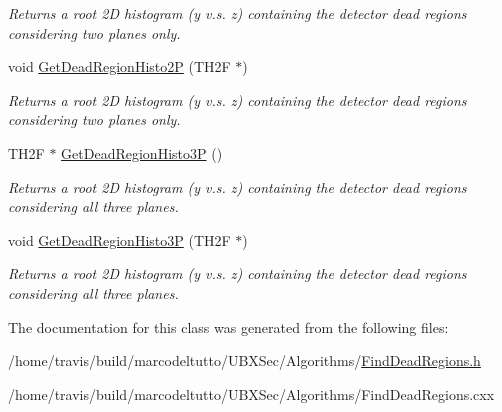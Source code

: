 \begin{DoxyCompactItemize}
\begin{DoxyCompactList}\small\item\em Returns a root 2\-D histogram (y v.\-s. z) containing the detector dead regions considering two planes only. \end{DoxyCompactList}\item 
\hypertarget{classFindDeadRegions_a93fcf74bb534831495f50a79fede19f9}{void \hyperlink{classFindDeadRegions_a93fcf74bb534831495f50a79fede19f9}{Get\-Dead\-Region\-Histo2\-P} (T\-H2\-F $\ast$)}\label{classFindDeadRegions_a93fcf74bb534831495f50a79fede19f9}

\begin{DoxyCompactList}\small\item\em Returns a root 2\-D histogram (y v.\-s. z) containing the detector dead regions considering two planes only. \end{DoxyCompactList}\item 
\hypertarget{classFindDeadRegions_abb378991861e7fdef4cd94a27d52ec07}{T\-H2\-F $\ast$ \hyperlink{classFindDeadRegions_abb378991861e7fdef4cd94a27d52ec07}{Get\-Dead\-Region\-Histo3\-P} ()}\label{classFindDeadRegions_abb378991861e7fdef4cd94a27d52ec07}

\begin{DoxyCompactList}\small\item\em Returns a root 2\-D histogram (y v.\-s. z) containing the detector dead regions considering all three planes. \end{DoxyCompactList}\item 
\hypertarget{classFindDeadRegions_a50de57c6d1792a6f2a93df8a44ba840a}{void \hyperlink{classFindDeadRegions_a50de57c6d1792a6f2a93df8a44ba840a}{Get\-Dead\-Region\-Histo3\-P} (T\-H2\-F $\ast$)}\label{classFindDeadRegions_a50de57c6d1792a6f2a93df8a44ba840a}

\begin{DoxyCompactList}\small\item\em Returns a root 2\-D histogram (y v.\-s. z) containing the detector dead regions considering all three planes. \end{DoxyCompactList}\end{DoxyCompactItemize}


The documentation for this class was generated from the following files\-:\begin{DoxyCompactItemize}
\item 
/home/travis/build/marcodeltutto/\-U\-B\-X\-Sec/\-Algorithms/\hyperlink{FindDeadRegions_8h}{Find\-Dead\-Regions.\-h}\item 
/home/travis/build/marcodeltutto/\-U\-B\-X\-Sec/\-Algorithms/Find\-Dead\-Regions.\-cxx\end{DoxyCompactItemize}
